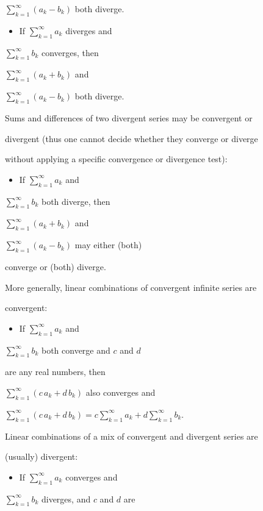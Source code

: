     $\textstyle \sum _{k=1}^{\infty} (a_k-b_k)$ both diverge.

\begin{itemize}
    \item If $\textstyle \sum _{k=1}^{\infty} a_k$ diverges and
\end{itemize}
    $\textstyle \sum _{k=1}^{\infty} b_k$ converges, then

    $\textstyle \sum _{k=1}^{\infty} (a_k+b_k)$ and

    $\textstyle \sum _{k=1}^{\infty} (a_k-b_k)$ both diverge.


Sums and differences of two divergent series may be convergent or

divergent (thus one cannot decide whether they converge or diverge

without applying a specific convergence or divergence test):


\begin{itemize}
    \item If $\textstyle \sum _{k=1}^{\infty} a_k$ and
\end{itemize}
    $\textstyle \sum _{k=1}^{\infty} b_k$ both diverge, then

    $\textstyle \sum _{k=1}^{\infty} (a_k+b_k)$ and

    $\textstyle \sum _{k=1}^{\infty} (a_k-b_k)$ may either (both)

    converge or (both) diverge.


More generally, linear combinations of convergent infinite series are

convergent:


\begin{itemize}
    \item If $\textstyle \sum _{k=1}^{\infty} a_k$ and
\end{itemize}
    $\textstyle \sum _{k=1}^{\infty} b_k$ both converge and $c$ and $d$

    are any real numbers, then

    $\textstyle \sum _{k=1}^{\infty} (c\,a_k+d\,b_k)$ also converges and

    $\textstyle \sum _{k=1}^{\infty} (c\,a_k+d\,b_k) = c \sum _{k=1}^{\infty} a_k + d \sum _{k=1}^{\infty} b_k.$


Linear combinations of a mix of convergent and divergent series are

(usually) divergent:


\begin{itemize}
    \item If $\textstyle \sum _{k=1}^{\infty} a_k$ converges and
\end{itemize}
    $\textstyle \sum _{k=1}^{\infty} b_k$ diverges, and $c$ and $d$ are

